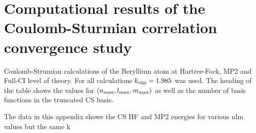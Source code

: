 \chapter{Computational results of the Coulomb-Sturmian correlation convergence study}
\label{apx:CSCorrelationConvergence}


\begin{table}
	\centering
	
	\caption{Coulomb-Strumian calculations of the Beryllium atom
		at Hartree-Fock, MP2 and Full-CI level of theory.
		For all calculations $k_\text{exp} = 1.985$ was used.
		The heading of the table shows the values for
		$(n_\text{max}, l_\text{max}, m_\text{max})$ as well as the
		number of basis functions
		in the truncated CS basis.}
	\label{tab:CStruncationEnergies}
\end{table}


The data in this appendix shows the CS HF and MP2 energies
for various nlm values but the same k
\begin{landscape}

\end{landscape}
